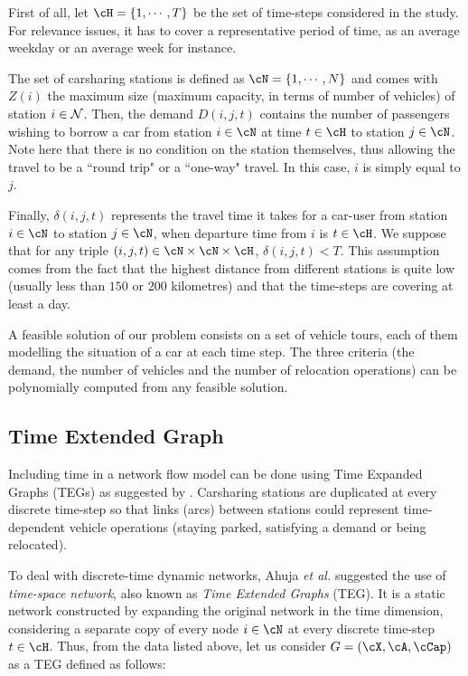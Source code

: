 \begin{bibunit}[ieeetr]
First of all, let ${\cH} = \{1, \cdots, T\}$ be the set of time-steps considered in the study. For relevance issues, it has to cover a representative period of time, as an average  weekday or an average week for instance.

The set of carsharing stations is defined as ${\cN} = \{1, \cdots, N\}$ and comes with $Z(i)$ the maximum size (\ie maximum capacity, in terms of number of vehicles) of station $i\in{\cal N}$. Then, the demand $D(i,j,t)$ contains the number of passengers wishing to borrow a car from station $i \in \cN$ at time $t \in \cH$ to station $j \in \cN$. 
Note here that there is no condition on the station themselves, thus allowing the travel to be a ``round trip" or a ``one-way" travel. In this case, $i$ is simply equal to $j$.

Finally, $\delta(i,j,t)$ represents the travel time it takes for a car-user from station $i \in \cN$ to station $j \in \cN$, when departure time from $i$ is $t \in \cH$.
We suppose that for any triple $(i,j,t)\in \cN \times \cN \times \cH$, $\delta(i,j,t)<T$. This assumption comes from the fact that the highest distance from different stations
is quite low (usually less than $150$ or $200$ kilometres) and that the time-steps are covering at least a day.

A feasible solution of our problem consists on a set of vehicle tours, each of them modelling the situation of a car at each time step. The three criteria (the demand, the number of vehicles and the number of relocation operations) can be polynomially computed from any feasible solution.

\subsection{Time Extended Graph}

Including time in a network flow model can be done using Time Expanded Graphs (TEGs) as suggested by \cite{ahuja1993}.
Carsharing stations are duplicated at every discrete time-step so that links (arcs) between stations could represent time-dependent vehicle operations (staying parked, satisfying a demand or being relocated).

To deal with discrete-time dynamic networks, Ahuja {\em et al.} \cite{ahujaNetwork1993} suggested the use of \emph{time-space network}, also known as \emph{Time Extended Graphs} (TEG). 
It is  a static network constructed by expanding the original network in the time dimension, considering a separate copy of every node $i \in \cN$ at every discrete time-step $t \in \cH$. Thus, from the data listed above, let us  consider $G = ({\cX}, {\cA}, \cCap)$ as a TEG defined as follows:


\end{bibunit}
